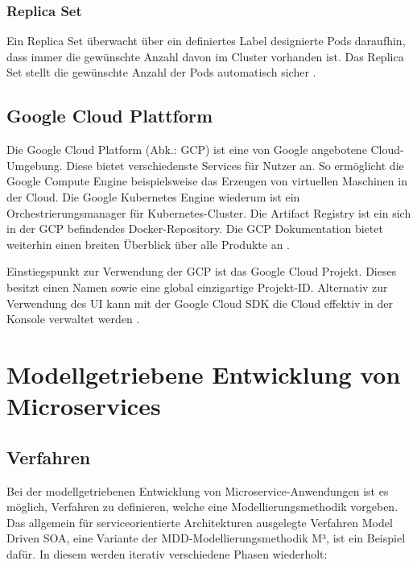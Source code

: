 {\subsubsection{Replica Set}

Ein Replica Set überwacht über ein definiertes Label designierte Pods daraufhin, dass immer die gewünschte Anzahl davon im Cluster vorhanden ist. Das Replica Set stellt die gewünschte Anzahl der Pods automatisch sicher \cite[S.179]{stender}.

\subsection{Google Cloud Plattform}

Die Google Cloud Platform (Abk.: GCP) ist eine von Google angebotene Cloud-Umgebung. Diese bietet verschiedenste Services für Nutzer an. So ermöglicht die Google Compute Engine beispielsweise das Erzeugen von virtuellen Maschinen in der Cloud. Die Google Kubernetes Engine wiederum ist ein Orchestrierungsmanager für Kubernetes-Cluster. Die Artifact Registry ist ein sich in der GCP befindendes Docker-Repository. Die GCP Dokumentation bietet weiterhin einen  breiten Überblick über alle Produkte an \cite{gcpdocs}.

Einstiegspunkt zur Verwendung der GCP ist das Google Cloud Projekt. Dieses besitzt einen Namen sowie eine global einzigartige Projekt-ID. Alternativ zur Verwendung des UI kann mit der Google Cloud SDK die Cloud effektiv in der Konsole verwaltet werden \cite[S.23-35]{riti}.

%
%

\pagebreak 
\section{Modellgetriebene Entwicklung von Microservices}

\subsection{Verfahren}

Bei der modellgetriebenen Entwicklung von Microservice-Anwendungen ist es möglich, Verfahren zu definieren, welche eine Modellierungsmethodik vorgeben. Das allgemein für serviceorientierte Architekturen ausgelegte Verfahren \glqq Model Driven SOA\grqq, eine Variante der MDD-Modellierungsmethodik M³, ist ein Beispiel dafür. In diesem werden iterativ verschiedene Phasen wiederholt:

}
